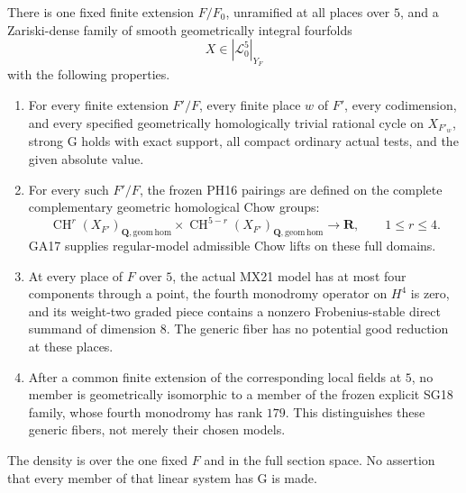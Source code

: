 \begin{theorem}
\label{r21mg:main}
There is one fixed finite extension $F/F_0$, unramified at all places
over $5$, and a Zariski-dense family of smooth geometrically integral
fourfolds
\[
                              X\in|\mathcal L_0^5|_{Y_F}
 \tag{MG21.4}\label{r21mg:family}
\]
with the following properties.
\begin{enumerate}
\item For every finite extension $F'/F$, every finite place $w$ of
$F'$, every codimension, and every specified geometrically
homologically trivial rational cycle on $X_{F'_w}$, strong G holds
with exact support, all compact ordinary actual tests, and the given
absolute value.
\item For every such $F'/F$, the frozen PH16 pairings are defined on
the complete complementary geometric homological Chow groups:
\[
 \operatorname{CH}^r(X_{F'})_{\mathbf Q,\mathrm{geom\,hom}}
   \times\operatorname{CH}^{5-r}(X_{F'})_{\mathbf Q,\mathrm{geom\,hom}}
          \longrightarrow\mathbf R,\qquad 1\le r\le4.
 \tag{MG21.5}\label{r21mg:height}
\]
GA17 supplies regular-model admissible Chow lifts on these full
domains.
\item At every place of $F$ over $5$, the actual MX21 model has at
most four components through a point, the fourth monodromy operator
on $H^4$ is zero, and its weight-two graded piece contains a
nonzero Frobenius-stable direct summand of dimension $8$.
The generic fiber has no potential good reduction at these places.
\item After a common finite extension of the corresponding local
fields at $5$, no member is geometrically isomorphic to a member of
the frozen explicit SG18 family, whose fourth monodromy has rank
$179$.  This distinguishes these generic fibers, not merely their
chosen models.
\end{enumerate}
The density is over the one fixed $F$ and in the full section space.
No assertion that every member of that linear system has G is made.
\end{theorem}


